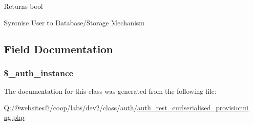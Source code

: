 \begin{DoxyReturn}{Returns}
bool 
\end{DoxyReturn}
Syronise User to Database/\-Storage Mechanism

\subsection{Field Documentation}
\hypertarget{class_xortify_auth_rest___curlserialised_provisionning_a486ed878bb5a7188c99ac4c9ee46ac6e}{
\subsubsection[{\$\-\_\-auth\-\_\-instance}]{\setlength{\rightskip}{0pt plus 5cm}\$\-\_\-auth\-\_\-instance}}\label{class_xortify_auth_rest___curlserialised_provisionning_a486ed878bb5a7188c99ac4c9ee46ac6e}


The documentation for this class was generated from the following file\-:\begin{DoxyCompactItemize}
\item 
Q\-:/@websites@/coop/labs/dev2/class/auth/\hyperlink{auth__rest__curlserialised__provisionning_8php}{auth\-\_\-rest\-\_\-curlserialised\-\_\-provisionning.\-php}\end{DoxyCompactItemize}
